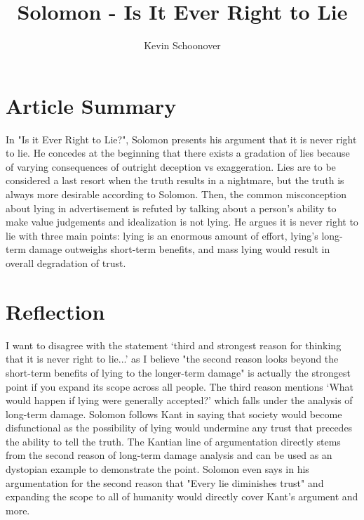 \documentclass[12pt]{article}
\begin{document}
\title{Solomon - Is It Ever Right to Lie}
\author{Kevin Schoonover}

\maketitle

\section{Article Summary}
In "Is it Ever Right to Lie?", Solomon presents his argument that it is never
right to lie. He concedes at the beginning that there exists a gradation of lies
because of varying consequences of outright deception vs exaggeration. Lies are
to be considered a last resort when the truth results in a nightmare, but the
truth is always more desirable according to Solomon. Then, the common
misconception about lying in advertisement is refuted by talking about a
person's ability to make value judgements and idealization is not
lying. He argues it is never right to lie with three main points: lying is an
enormous amount of effort, lying's long-term damage outweighs short-term
benefits, and mass lying would result in overall degradation of trust. 

\section{Reflection}
I want to disagree with the statement `third and strongest reason for thinking
that it is never right to lie...' as I believe "the second reason looks beyond
the short-term benefits of lying to the longer-term damage" is actually the
strongest point if you expand its scope across all people. The third reason
mentions `What would happen if lying were generally accepted?' which falls under
the analysis of long-term damage. Solomon follows Kant in saying that society
would become disfunctional as the possibility of lying would undermine any trust
that precedes the ability to tell the truth. The Kantian line of argumentation directly stems
from the second reason of long-term damage analysis and can be used as an
dystopian example to demonstrate the point. Solomon even says in his
argumentation for the second reason that "Every lie diminishes trust" and
expanding the scope to all of humanity would directly cover Kant's argument and
more.
\end{document}
